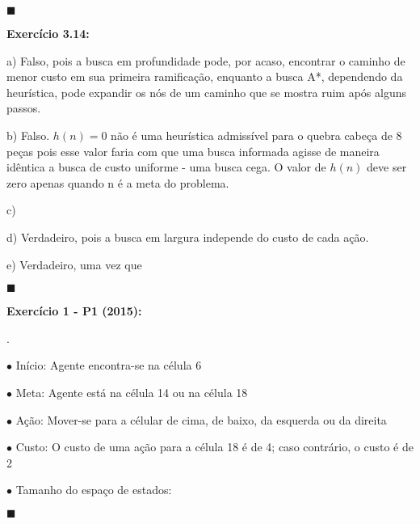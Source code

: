 \documentclass{article}
\begin{document}
\begin{flushright}
$\blacksquare$
\end{flushright}


\bigskip
\textbf{Exercício 3.14:}

\bigskip
\quad a) Falso, pois a busca em profundidade pode, por acaso, encontrar o caminho de menor custo em sua primeira ramificação, enquanto a busca A*, dependendo da heurística, pode expandir os nós de um caminho que se mostra ruim após alguns passos.

\bigskip
\quad b) Falso. $h(n) = 0$ não é uma heurística admissível para o quebra cabeça de 8 peças pois esse valor faria com que uma busca informada agisse de maneira idêntica a busca de custo uniforme - uma busca cega. O valor de $h(n)$ deve ser zero apenas quando n é a meta do problema.

\bigskip
\quad c)

\bigskip
\quad d) Verdadeiro, pois a busca em largura independe do custo de cada ação.

\bigskip
\quad e) Verdadeiro, uma vez que

\begin{flushright}
$\blacksquare$
\end{flushright}


\bigskip
\textbf{Exercício 1 - P1 (2015):}

\bigskip
{}.

\qquad$\bullet$ Início: Agente encontra-se na célula 6

\qquad$\bullet$ Meta: Agente está na célula 14 ou na célula 18

\qquad$\bullet$ Ação: Mover-se para a célular de cima, de baixo, da esquerda ou da direita

\qquad$\bullet$ Custo: O custo de uma ação para a célula 18 é de 4; caso contrário, o custo é de 2

\qquad$\bullet$ Tamanho do espaço de estados: 

\begin{flushright}
$\blacksquare$
\end{flushright}

\end{document}
